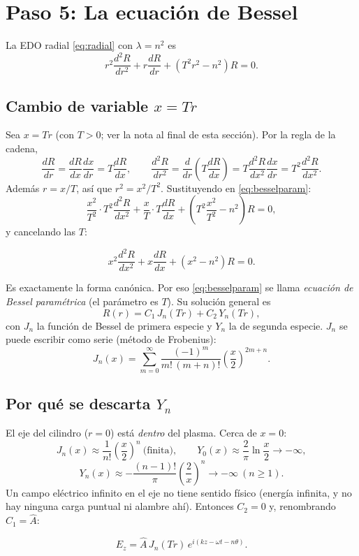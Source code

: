 \documentclass[11pt,a4paper]{article}
\begin{document}
\section{Paso 5: La ecuación de Bessel}

La EDO radial \eqref{eq:radial} con $\lambda=n^2$ es
\begin{equation}
r^2\frac{d^2R}{dr^2}+r\frac{dR}{dr}+(T^2r^2-n^2)R=0 .
\label{eq:besselparam}
\end{equation}
\subsection{Cambio de variable $x=Tr$}
Sea $x=Tr$ (con $T>0$; ver la nota al final de esta sección). Por la regla de la cadena,
\[
\frac{dR}{dr}=\frac{dR}{dx}\frac{dx}{dr}=T\frac{dR}{dx},\qquad
\frac{d^2R}{dr^2}=\frac{d}{dr}\left(T\frac{dR}{dx}\right)=T\frac{d^2R}{dx^2}\frac{dx}{dr}=T^2\frac{d^2R}{dx^2}.
\]
Además $r=x/T$, así que $r^2=x^2/T^2$. Sustituyendo en \eqref{eq:besselparam}:
\[
\frac{x^2}{T^2}\cdot T^2\frac{d^2R}{dx^2}+\frac{x}{T}\cdot T\frac{dR}{dx}+\left(T^2\frac{x^2}{T^2}-n^2\right)R=0,
\]
y cancelando las $T$:
\begin{resultado}
\[
x^2\frac{d^2R}{dx^2}+x\frac{dR}{dx}+(x^2-n^2)R=0 .
\]
\end{resultado}
Es exactamente la forma canónica. Por eso \eqref{eq:besselparam} se llama \emph{ecuación de Bessel paramétrica} (el parámetro es $T$). Su solución general es
\[
R(r)=C_1\,J_n(Tr)+C_2\,Y_n(Tr),
\]
con $J_n$ la función de Bessel de primera especie y $Y_n$ la de segunda especie. $J_n$ se puede escribir como serie (método de Frobenius):
\[
J_n(x)=\sum_{m=0}^{\infty}\frac{(-1)^m}{m!\,(m+n)!}\left(\frac{x}{2}\right)^{2m+n}.
\]

\subsection{Por qué se descarta $Y_n$}
El eje del cilindro ($r=0$) está \emph{dentro} del plasma. Cerca de $x=0$:
\[
J_n(x)\approx\frac{1}{n!}\left(\frac{x}{2}\right)^n\ \text{(finita)},\qquad
Y_0(x)\approx\frac{2}{\pi}\ln\frac{x}{2}\to-\infty,
\]
\[
Y_n(x)\approx-\frac{(n-1)!}{\pi}\left(\frac{2}{x}\right)^n\to-\infty\ (n\ge1).
\]
Un campo eléctrico infinito en el eje no tiene sentido físico (energía infinita, y no hay ninguna carga puntual ni alambre ahí). Entonces $C_2=0$ y, renombrando $C_1=\hat A$:
\begin{resultado}[Ecuación 4.8.12]
\[
E_z=\hat A\,J_n(Tr)\,e^{i(kz-\omega t-n\theta)} .
\]
\end{resultado}
\end{document}
